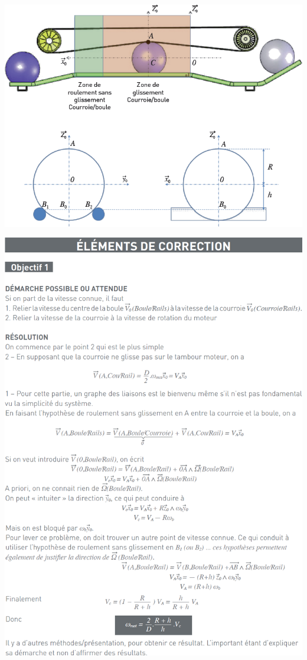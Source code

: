 \documentclass[10pt,fleqn]{article} %
\begin{document}
\begin{multicols}{2}
\begin{center}
\includegraphics[width=\linewidth]{images/fig_04}
\end{center}

\ifprof
\else
\end{multicols}
\fi




\begin{center}
\includegraphics[width=\linewidth]{images/cor_01}
\end{center}
\end{document}

